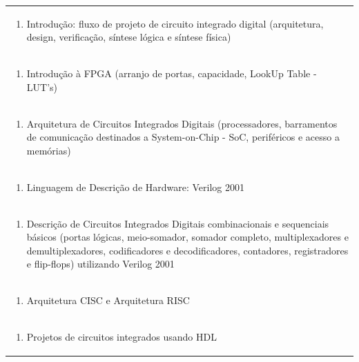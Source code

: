 \documentclass[11pt]{article}
\begin{document}
\begin{center}
\begin{longtable}{|p{4cm}|p{4cm}|p{4cm}|p{4cm}|}
\multicolumn{4}{|p{\dimexpr 16cm + 6\tabcolsep\relax}|}{\begin{enumerate}[start=1]\item Introdução: fluxo de projeto de circuito integrado digital (arquitetura, design, verificação, síntese lógica e síntese física)\end{enumerate}}\\
\multicolumn{4}{|p{\dimexpr 16cm + 6\tabcolsep\relax}|}{\begin{enumerate}[start=2]\item Introdução à FPGA (arranjo de portas, capacidade, LookUp Table - LUT's)\end{enumerate}}\\
\multicolumn{4}{|p{\dimexpr 16cm + 6\tabcolsep\relax}|}{\begin{enumerate}[start=3]\item Arquitetura de Circuitos Integrados Digitais (processadores, barramentos de comunicação destinados a System-on-Chip - SoC, periféricos e acesso a memórias)\end{enumerate}}\\
\multicolumn{4}{|p{\dimexpr 16cm + 6\tabcolsep\relax}|}{\begin{enumerate}[start=4]\item Linguagem de Descrição de Hardware: Verilog 2001\end{enumerate}}\\
\multicolumn{4}{|p{\dimexpr 16cm + 6\tabcolsep\relax}|}{\begin{enumerate}[start=5]\item Descrição de Circuitos Integrados Digitais combinacionais e sequenciais básicos (portas lógicas, meio-somador, somador completo, multiplexadores e demultiplexadores, codificadores e decodificadores, contadores, registradores e flip-flops) utilizando Verilog 2001\end{enumerate}}\\
\multicolumn{4}{|p{\dimexpr 16cm + 6\tabcolsep\relax}|}{\begin{enumerate}[start=6]\item Arquitetura CISC e Arquitetura RISC\end{enumerate}}\\
\multicolumn{4}{|p{\dimexpr 16cm + 6\tabcolsep\relax}|}{\begin{enumerate}[start=7]\item Projetos de circuitos integrados usando HDL\end{enumerate}}\\

\end{longtable}
\end{center}
\end{document}
